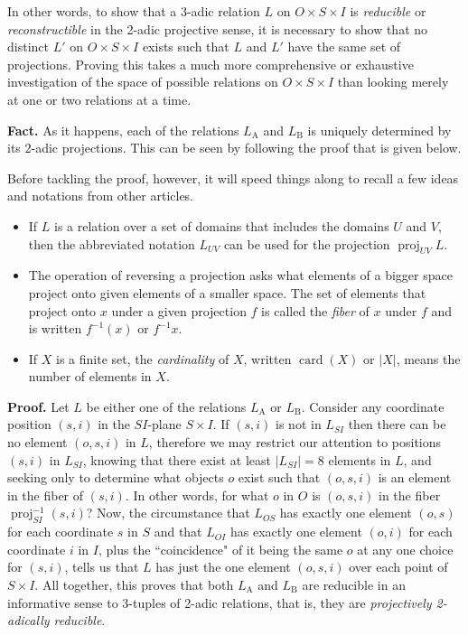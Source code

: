 \documentclass[12pt]{article}
\begin{document}
In other words, to show that a 3-adic relation $L$ on $O \times S \times I$ is \textit{reducible} or \textit{reconstructible} in the 2-adic projective sense, it is necessary to show that no distinct $L'$ on $O \times S \times I$ exists such that $L$ and $L'$ have the same set of projections.  Proving this takes a much more comprehensive or exhaustive investigation of the space of possible relations on $O \times S \times I$ than looking merely at one or two relations at a time.

\textbf{Fact.}  As it happens, each of the relations $L_{\mathrm{A}}$ and $L_{\mathrm{B}}$ is uniquely determined by its 2-adic projections.  This can be seen by following the proof that is given below.

Before tackling the proof, however, it will speed things along to recall a few ideas and notations from other articles.

\begin{itemize}
\item
If $L$ is a relation over a set of domains that includes the domains $U$ and $V$, then the abbreviated notation $L_{UV}$ can be used for the projection $\operatorname{proj}_{UV}L$.
\item
The operation of reversing a projection asks what elements of a bigger space project onto given elements of a smaller space.  The set of elements that project onto $x$ under a given projection $f$ is called the \textit{fiber} of $x$ under $f$ and is written $f^{-1}(x)$ or $f^{-1}x$.
\item
If $X$ is a finite set, the \textit{cardinality} of $X$, written $\operatorname{card}(X)$ or $|X|$, means the number of elements in $X$.
\end{itemize}

\textbf{Proof.}  Let $L$ be either one of the relations $L_{\mathrm{A}}$ or $L_{\mathrm{B}}$.  Consider any coordinate position $(s, i)$ in the $SI$-plane $S \times I$.  If $(s, i)$ is not in $L_{SI}$ then there can be no element $(o, s, i)$ in $L$, therefore we may restrict our attention to positions $(s, i)$ in $L_{SI}$, knowing that there exist at least $|L_{SI}| = 8$ elements in $L$, and seeking only to determine what objects $o$ exist such that $(o, s, i)$ is an element in the fiber of $(s, i)$.  In other words, for what $o$ in $O$ is $(o, s, i)$ in the fiber $\operatorname{proj}_{SI}^{-1}(s, i)$?  Now, the circumstance that $L_{OS}$ has exactly one element $(o, s)$ for each coordinate $s$ in $S$ and that $L_{OI}$ has exactly one element $(o, i)$ for each coordinate $i$ in $I$, plus the ``coincidence" of it being the same $o$ at any one choice for $(s, i)$, tells us that $L$ has just the one element $(o, s, i)$ over each point of $S \times I$.  All together, this proves that both $L_{\mathrm{A}}$ and $L_{\mathrm{B}}$ are reducible in an informative sense to 3-tuples of 2-adic relations, that is, they are \textit{projectively 2-adically reducible}.
\end{document}
